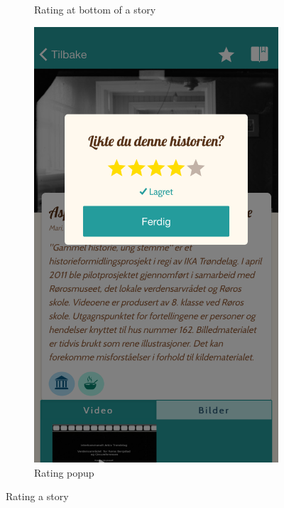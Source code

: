 \begin{appendices}
\begin{figure}[h!]
\begin{subfigure}[h]{0.32\textwidth}
			\caption{Rating at bottom of a story}
		\end{subfigure}
		\hspace{1cm}
		\begin{subfigure}[h]{0.32\textwidth}
			\includegraphics[width=\textwidth]{fig/screenshot_rating}
			\caption{Rating popup}
		\end{subfigure}
		\caption{Rating a story}
		\label{fig:manual_rating}
	\end{figure}


\end{appendices}
